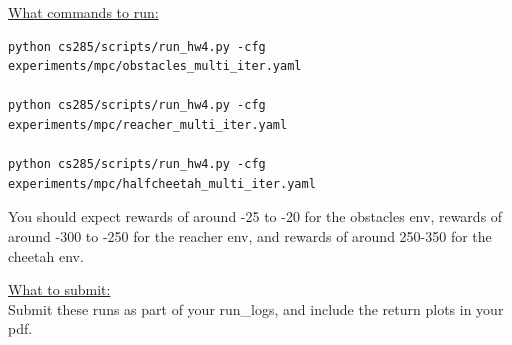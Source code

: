 \documentclass{article} %
\begin{document}
\underline{What commands to run:}
\begin{lstlisting}[escapechar=@]
python cs285/scripts/run_hw4.py -cfg experiments/mpc/obstacles_multi_iter.yaml

python cs285/scripts/run_hw4.py -cfg experiments/mpc/reacher_multi_iter.yaml

python cs285/scripts/run_hw4.py -cfg experiments/mpc/halfcheetah_multi_iter.yaml
\end{lstlisting}

You should expect rewards of around -25 to -20 for the obstacles env, rewards of around -300 to -250 for the reacher env, and rewards of around 250-350 for the cheetah env.

\underline{What to submit:}\\
Submit these runs as part of your run\_logs, and include the return plots in your pdf.
\end{document}
